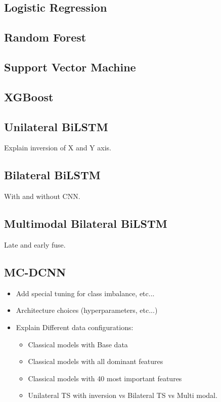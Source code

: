 \subsection{Logistic Regression}\label{subsec:method-baselines}
\subsection{Random Forest}\label{subsec:method-baselines}
\subsection{Support Vector Machine}\label{subsec:method-baselines}
\subsection{XGBoost}\label{subsec:method-baselines}
\subsection{Unilateral BiLSTM}\label{subsec:method-deep-learning}
Explain inversion of X and Y axis.
\subsection{Bilateral BiLSTM}\label{subsec:method-deep-learning}
With and without CNN.
\subsection{Multimodal Bilateral BiLSTM}\label{subsec:method-deep-learning}
Late and early fuse.
\subsection{MC-DCNN}\label{subsec:method-deep-learning}

\begin{itemize}
    \item Add special tuning for class imbalance, etc...
    \item Architecture choices (hyperparameters, etc...)
    \item Explain Different data configurations:
    \begin{itemize}
        \item Classical models with Base data
        \item Classical models with all dominant features
        \item Classical models with 40 most important features
        \item Unilateral TS with inversion vs Bilateral TS vs Multi modal.
    \end{itemize}
\end{itemize}

